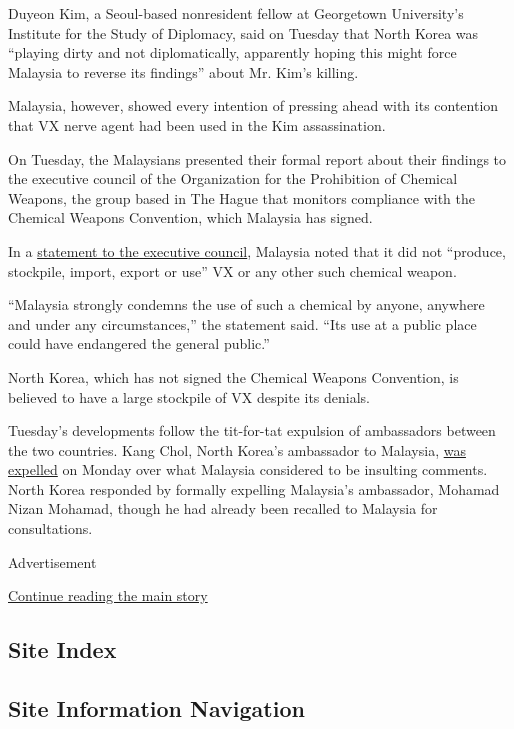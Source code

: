 Duyeon Kim, a Seoul-based nonresident fellow at Georgetown University's
Institute for the Study of Diplomacy, said on Tuesday that North Korea
was ``playing dirty and not diplomatically, apparently hoping this might
force Malaysia to reverse its findings'' about Mr. Kim's killing.

Malaysia, however, showed every intention of pressing ahead with its
contention that VX nerve agent had been used in the Kim assassination.

On Tuesday, the Malaysians presented their formal report about their
findings to the executive council of the Organization for the
Prohibition of Chemical Weapons, the group based in The Hague that
monitors compliance with the Chemical Weapons Convention, which Malaysia
has signed.

In a
\href{https://www.opcw.org/fileadmin/OPCW/EC/84/en/Malaysia_ec84_statement.pdf}{statement
to the executive council}, Malaysia noted that it did not ``produce,
stockpile, import, export or use'' VX or any other such chemical weapon.

``Malaysia strongly condemns the use of such a chemical by anyone,
anywhere and under any circumstances,'' the statement said. ``Its use at
a public place could have endangered the general public.''

North Korea, which has not signed the Chemical Weapons Convention, is
believed to have a large stockpile of VX despite its denials.

Tuesday's developments follow the tit-for-tat expulsion of ambassadors
between the two countries. Kang Chol, North Korea's ambassador to
Malaysia,
\href{https://www.nytimes.com/2017/03/06/world/asia/vx-north-korea-kim-jong-nam.html}{was
expelled} on Monday over what Malaysia considered to be insulting
comments. North Korea responded by formally expelling Malaysia's
ambassador, Mohamad Nizan Mohamad, though he had already been recalled
to Malaysia for consultations.

Advertisement

\protect\hyperlink{after-bottom}{Continue reading the main story}

\hypertarget{site-index}{%
\subsection{Site Index}\label{site-index}}

\hypertarget{site-information-navigation}{%
\subsection{Site Information
Navigation}\label{site-information-navigation}}

